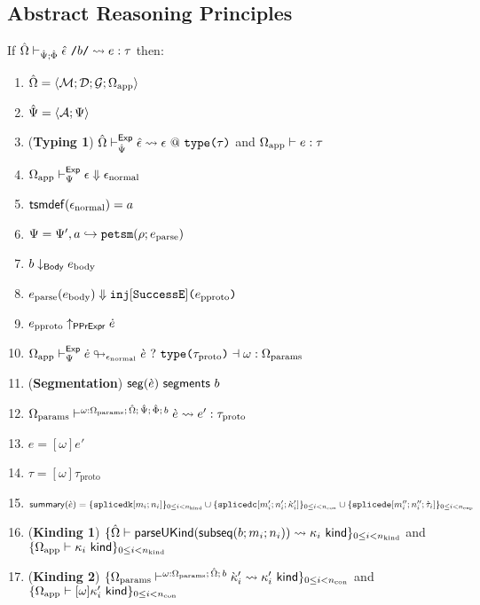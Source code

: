 \subsection{Abstract Reasoning Principles}
\begin{theorem}
\label{thm:petsm-abstract-reasoning-principles}
If ${\hat\Omega} \vdash_{\hat{\Psi}; \hat\Phi} {\hat\epsilon}~\texttt{/}b\texttt{/} \leadsto e : \tau$ then:
\begin{enumerate}
  \item ${\hat\Omega}=\langle \mathcal{M}; \mathcal{D}; \mathcal{G}; \Omega_\text{app} \rangle$
  \item $\hat{\Psi}=\langle \mathcal{A}; \Psi \rangle$
  \item (\textbf{Typing 1}) ${\hat\Omega} \vdash_{\hat{\Psi}}^{\mathsf{Exp}} {\hat\epsilon} \leadsto \epsilon~@~\texttt{type}\texttt{(}\tau\texttt{)}$ and $\Omega_\text{app} \vdash e : \tau$
  \item $\Omega_\text{app} \vdash_{\Psi}^\mathsf{Exp} \epsilon \Downarrow \epsilon_\text{normal}$
  \item $\mathsf{tsmdef}(\epsilon_\text{normal})=a$
  \item $\Psi = \Psi', a \hookrightarrow \texttt{petsm}(\rho; e_\text{parse})$
  \item $b \downarrow_\mathsf{Body} e_\text{body}$
    \item $e_\text{parse}(e_\text{body}) \Downarrow \texttt{inj}[\mathtt{SuccessE}]\texttt{(}e_\text{pproto}\texttt{)}$
  \item $e_\text{pproto} \uparrow_\mathsf{PPrExpr} \dot{e}$
  \item $\Omega_\text{app} \vdash_{\Psi}^\mathsf{Exp} \dot{e} \looparrowright_{\epsilon_\text{normal}} \grave{e} ~?~ \texttt{type}\texttt{(}\tau_\text{proto}\texttt{)} \dashv \omega : \Omega_\text{params}$
  \item (\textbf{Segmentation}) $\mathsf{seg}(\grave{e})~\mathsf{segments}~b$
  \item $\Omega_\text{params} \vdash^{\omega : \Omega_\text{params};\,{\hat\Omega};\,\hat{\Psi};\,\hat\Phi;\,b} \grave{e} \leadsto e' : \tau_\text{proto}$
  \item $e = [\omega]e'$
  \item $\tau = [\omega]\tau_\text{proto}$
  \item $
    \mathsf{summary}(\grave{e}) = \{\texttt{splicedk}[m_i; n_i]\}_{0 \leq i < n_\text{kind}} \cup \{\texttt{splicedc}[m'_i; n'_i; {\grave\kappa}'_i]\}_{0 \leq i < n_\text{con}} \cup\\
               \{\texttt{splicede}[m''_i; n''_i; \grave{\tau}_i]\}_{0 \leq i < n_\text{exp}}
    $
  \item (\textbf{Kinding 1}) $\{{\hat\Omega} \vdash \mathsf{parseUKind}(\mathsf{subseq}(b; m_i; n_i)) \leadsto \kappa_i~\mathsf{kind}\}_{0 \leq i < n_\text{kind}}$ and $\{\Omega_\text{app} \vdash \kappa_i~\mathsf{kind}\}_{0 \leq i < n_\text{kind}}$
  \item (\textbf{Kinding 2}) $\{\Omega_\text{params} \vdash^{\omega : \Omega_\text{params};\,{\hat\Omega};\,b} {\grave\kappa}'_i \leadsto \kappa'_i~\mathsf{kind}\}_{0 \leq i < n_\text{con}}$ and $\{\Omega_\text{app} \vdash [\omega]\kappa'_i~\mathsf{kind}\}_{0 \leq i < n_\text{con}}$

\end{enumerate}
\end{theorem}
